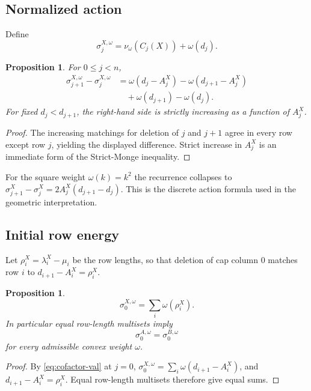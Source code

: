\documentclass[11pt,a4paper]{amsart}
\numberwithin{equation}{section}
\theoremstyle{plain}
\newtheorem{proposition}[theorem]{Proposition}
\theoremstyle{definition}
\newcommand{\wto}{\nu_{\omega}}
\begin{document}
\subsection{Normalized action}

Define
\begin{equation}\label{eq:sigma-def}
\sigma_j^{X,\omega}
=
\wto(C_j(X))+\omega(d_j).
\end{equation}

\begin{proposition}\label{prop:action-recurrence}
For \(0\le j<n\),
\[
\begin{aligned}
\sigma_{j+1}^{X,\omega}-\sigma_j^{X,\omega}
&=
\omega(d_j-A_j^X)-\omega(d_{j+1}-A_j^X)\\
&\quad+\omega(d_{j+1})-\omega(d_j).
\end{aligned}
\]
For fixed \(d_j<d_{j+1}\), the right-hand side is strictly increasing as a function of \(A_j^X\).
\end{proposition}

\begin{proof}
The increasing matchings for deletion of \(j\) and \(j+1\) agree in every row except row \(j\), yielding the displayed difference.  Strict increase in \(A_j^X\) is an immediate form of the Strict-Monge inequality.
\end{proof}

For the square weight \(\omega(k)=k^2\) the recurrence collapses to \(\sigma_{j+1}^X-\sigma_j^X =2A_j^X(d_{j+1}-d_j)\).
This is the discrete action formula used in the geometric interpretation.

\subsection{Initial row energy}

Let \(\rho_i^X=\lambda_i^X-\mu_i\)
be the row lengths, so that deletion of cap column \(0\) matches row \(i\) to \(d_{i+1}-A_i^X=\rho_i^X\).

\begin{proposition}\label{prop:initial-energy}
\begin{equation}\label{eq:initial-energy}
\sigma_0^{X,\omega}=\sum_i\omega(\rho_i^X).
\end{equation}
In particular equal row-length multisets imply
\[
\sigma_0^{A,\omega}=\sigma_0^{B,\omega}
\]
for every admissible convex weight \(\omega\).
\end{proposition}

\begin{proof}
By \eqref{eq:cofactor-val} at \(j=0\), \(\sigma_0^{X,\omega}=\sum_i\omega(d_{i+1}-A_i^X)\), and \(d_{i+1}-A_i^X=\rho_i^X\).  Equal row-length multisets therefore give equal sums.
\end{proof}
\end{document}
